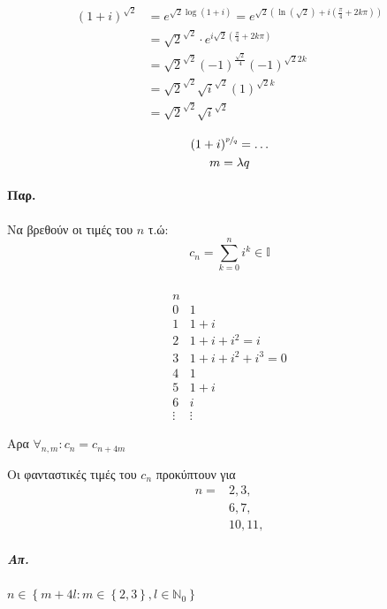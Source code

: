 \documentclass[12pt,a4paper,notitlepage,fleqn]{article}
\begin{document}
    \begin{align*}
    (1+i)^{\sqrt{2}} &= e^{\sqrt{2}\log(1+i)} = e^{\sqrt{2}\left(
    	\ln\left(\sqrt{2}\right)+i\left(\frac{\pi}{4}+2k\pi\right)
    	\right)} \\ &=
    \sqrt{2}^{\sqrt{2}}\cdot e^{i\sqrt{2}\left(\frac{\pi}{4}+2k\pi\right)}
      \\ &=\sqrt{2}^{\sqrt{2}}\left(-1\right)^{\frac{\sqrt{2}}{4}}\left(-1\right)^{\sqrt{2}2k} \\
         &=\sqrt{2}^{\sqrt{2}}\sqrt{i}^{\sqrt{2}}\left(1\right)^{\sqrt{2}k} \\
         &=\sqrt{2}^{\sqrt{2}}\sqrt{i}^{\sqrt{2}}
    \end{align*}

    \begin{gather*}
    (1+i)^{\sfrac{p}{q}}=\dots\\ m=\lambda q
    \end{gather*}

    \paragraph{Παρ.}
    Να βρεθούν οι τιμές του \( n \) τ.ώ:
    \[
    c_n = \sum_{k=0}^n i^k \in \mathbb I
    \]

    \subparagraph{}
    \[
    \begin{array}{r|l}
    n & \\ \hline
    0 & 1 \\ 1 & 1+i \\ 2 & 1+i+i^2=i \\ 3 & 1+i+i^2+i^3=0 \\ 4 & 1
    \\ \hline
    5 & 1+i \\ 6 & i \\ \vdots & \vdots
    \end{array}
    \]

    Αρα \( \forall_{n,m}: c_n=c_{n+4m} \)

    Οι φανταστικές τιμές του \( c_n \) προκύπτουν για
    \begin{align*}
    	n =& 2,3, \\& 6,7, \\ & 10,11,
    \end{align*}

    \subparagraph{Απ.} \(
    n\in\left\lbrace m+4l: m\in\left\lbrace 2,3 \right\rbrace
    ,l\in \mathbb N_0
    \right\rbrace
     \)
\end{document}
